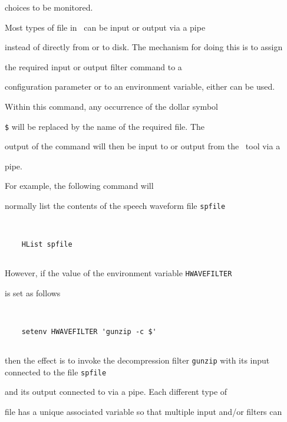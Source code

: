 choices to be monitored.










Most types of file in \HTK\ can be input or output via a pipe


instead of directly from or to disk.  The mechanism for doing this is to assign


the required input or output filter command to a


configuration parameter or to an environment variable, either can be used.


Within this command, any occurrence of the dollar symbol


\verb+$+ will be replaced by the name of the required file. The


output of the command will then be input to or output from the \HTK\ tool via a


pipe.





For example, the following command will


normally list the contents of the speech waveform file \texttt{spfile}


\begin{verbatim}


    HList spfile


\end{verbatim}


However, if the value of the environment variable \texttt{HWAVEFILTER}


is set as follows


\begin{verbatim}


    setenv HWAVEFILTER 'gunzip -c $'


\end{verbatim}


then the effect is to invoke the decompression filter \texttt{gunzip} with its input connected to the file \texttt{spfile}


and its output connected to  via a pipe.  Each different type of


file has a unique associated variable so that multiple input and/or filters can


